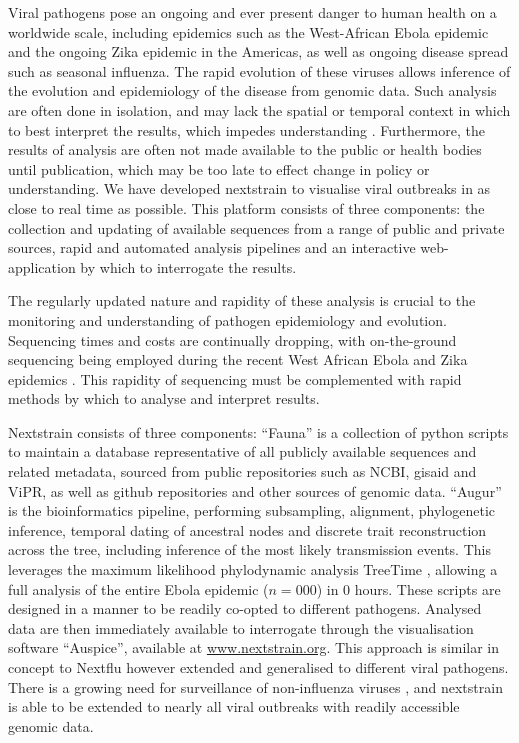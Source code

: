 \documentclass{bioinfo}
\begin{document}
Viral pathogens pose an ongoing and ever present danger to human health on a worldwide scale, including epidemics such as the West-African Ebola epidemic and the ongoing Zika epidemic in the Americas, as well as ongoing disease spread such as seasonal influenza. 
The rapid evolution of these viruses allows inference of the evolution and epidemiology of the disease from genomic data. 
Such analysis are often done in isolation, and may lack the spatial or temporal context in which to best interpret the results, which impedes understanding \citep{Pybus:2013bj}.
Furthermore, the results of analysis are often not made available to the public or health bodies until publication, which may be too late to effect change in policy or understanding. 
We have developed nextstrain to visualise viral outbreaks in as close to real time as possible.
This platform consists of three components: the collection and updating of available sequences from a range of public and private sources, rapid and automated analysis pipelines and an interactive web-application by which to interrogate the results. 


The regularly updated nature and rapidity of these analysis is crucial to the monitoring and understanding of pathogen epidemiology and evolution.  
Sequencing times and costs are continually dropping, with on-the-ground sequencing being employed during the recent West African Ebola and Zika epidemics \citep{Quick:2016kf,Faria105171}.
This rapidity of sequencing must be complemented with rapid methods by which to analyse and interpret results.


Nextstrain consists of three components:
``Fauna'' is a collection of python scripts to maintain a database representative of all publicly available sequences and related metadata, sourced from public repositories such as NCBI, gisaid and ViPR, as well as github repositories and other sources of genomic data. ``Augur'' is the bioinformatics pipeline, performing subsampling, alignment, phylogenetic inference, temporal dating of ancestral nodes and discrete trait reconstruction across the tree, including inference of the most likely transmission events.
This leverages the maximum likelihood phylodynamic analysis TreeTime \citep{Sagulenko:2017vm}, allowing a full analysis of the entire Ebola epidemic ($n=000$) in 0 hours. 
These scripts are designed in a manner to be readily co-opted to different pathogens.
Analysed data are then immediately available to interrogate through the visualisation software ``Auspice'', available at \href{www.nextstrain.org}{www.nextstrain.org}.
This approach is similar in concept to Nextflu \citep{neher2015nextflu} however extended and generalised to different viral pathogens.
There is a growing need for surveillance of non-influenza viruses \citep{FRCPath:2017fg}, and nextstrain is able to be extended to nearly all viral outbreaks with readily accessible genomic data. 
\end{document}

